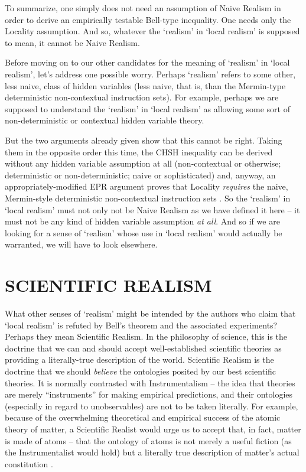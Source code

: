 \documentclass[12pt]{article}
\begin{document}
To summarize, one simply does not need an assumption of Naive Realism
in order to derive an empirically testable Bell-type inequality.  One
needs only the Locality assumption.  And so, whatever the `realism'
in `local realism' is supposed to mean, it cannot be Naive Realism.

Before moving on to our other candidates for the meaning of
`realism' in `local realism', let's address one possible worry.
Perhaps `realism' refers to some other, less naive, class of hidden
variables (less naive, that is, than the Mermin-type
deterministic non-contextual instruction sets).  For example, perhaps
we are supposed to understand the `realism' in `local realism' as
allowing some sort of non-deterministic or contextual hidden
variable theory.  

But the two arguments already given show that this cannot be right.
Taking them in the opposite order this time, the CHSH inequality can
be derived without any hidden variable assumption at all
(non-contextual or otherwise; deterministic or non-deterministic; 
naive or sophisticated) and, anyway, an appropriately-modified EPR
argument proves that Locality \emph{requires} the naive, Mermin-style 
deterministic non-contextual instruction sets \cite{nonlocchar}.  So the
`realism' in `local realism' must not only not be Naive Realism as
we have defined it here -- it must not be any kind of hidden variable
assumption \emph{at all}.  And so if we are looking for a sense of
`realism' whose use in `local realism' would actually be
warranted, we will have to look elsewhere.


\section{SCIENTIFIC REALISM}

What other senses of `realism' might be intended by the authors who
claim that `local realism' is refuted by Bell's theorem and the
associated experiments?  Perhaps they mean Scientific Realism.  In the
philosophy of science, this is the doctrine that we can and should
accept well-established scientific theories as providing a
literally-true description of the world.  Scientific Realism is the
doctrine that we should \emph{believe} the ontologies posited by our
best scientific theories.  It is normally contrasted with
Instrumentalism -- the idea that theories are merely ``instruments''
for making empirical predictions, and their ontologies (especially in
regard to unobservables) are not to be taken literally.  
For example, because of the overwhelming
theoretical and empirical success of the atomic theory of matter, a
Scientific Realist would urge us to accept
that, in fact, matter is made of atoms -- that the ontology of atoms is not
merely a useful fiction (as the Instrumentalist would hold) but a
literally true description of matter's actual constitution \cite{scirealism}. 
\end{document}

